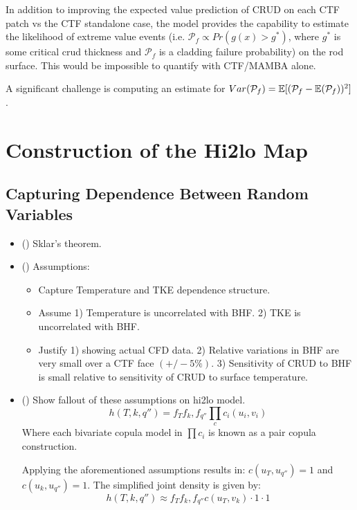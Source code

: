 In addition to improving the expected value prediction of CRUD on each CTF patch vs the CTF standalone case, the model provides the capability to estimate the likelihood of extreme value events (i.e. $\mathcal P_f \propto Pr(g(x) > g^*)$, where $g^*$ is some critical crud thickness and $\mathcal P_f$ is a cladding failure probability) on the rod surface.  This would be impossible to quantify with CTF/MAMBA alone.

A significant challenge is computing an estimate for $Var(\mathcal P_f) = \operatorname*{\mathbb{E}}[(\mathcal P_f - \operatorname*{\mathbb{E}}(\mathcal P_f))^2]$.


\section{Construction of the Hi2lo Map}

\subsection{Capturing Dependence Between Random Variables}
\begin{itemize}
        \item (\checkmark) Sklar's theorem.
        \item (\checkmark) Assumptions:
        \begin{itemize}
                \item Capture Temperature and TKE dependence structure.
                \item Assume 1) Temperature is uncorrelated with BHF.  2) TKE is uncorrelated with BHF.
                \item Justify 1) showing actual CFD data. 2) Relative variations in BHF are very small over a CTF face $(+/- 5\%)$.  3) Sensitivity of CRUD to BHF is small relative to sensitivity of CRUD to surface temperature.
        \end{itemize}
        \item (\checkmark) Show fallout of these assumptions on hi2lo model.
        \begin{equation}
                h(T, k, q'') = f_T f_k, f_{q''} \prod_c c_i(u_i, v_i)
        \end{equation}
        Where each bivariate copula model in $\prod c_i $ is known as a pair copula construction.

        Applying the aforementioned assumptions results in: $c(u_T, u_{q''}) = 1$ and $c(u_{k}, u_{q''}) = 1$. The simplified joint density is given by:
        \begin{equation}
                h(T, k, q'') \approx  f_T f_k, f_{q''} c(u_{T}, v_{k})  \cdot 1 \cdot 1
    \end{equation}
\end{itemize}


